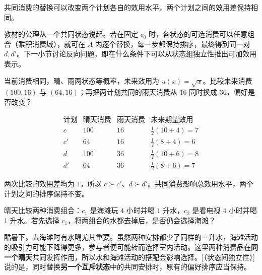 共同消费的替换可以改变两个计划各自的效用水平，两个计划之间的效用差保持相同。

教材的公理从一个共同状态说起。若在固定 $c_0$ 时，各状态的可选消费可以任意组合（乘积消费域），就可在 $A$ 内逐个替换，每一步都保持排序，最终得到同一对 $d,d'$。下一小节讨论反向问题，即在什么条件下可以从状态组独立性推出可加效用表示。

\begin{tcolorbox}[example,title=课堂例题：共同消费的替换]
\begin{question}
当前消费相同，晴、雨两状态等概率，未来效用为 $u(x)=\sqrt{x}$。比较未来消费 $(100,16)$ 与 $(64,16)$；再把两计划共同的雨天消费从 $16$ 同时换成 $36$，偏好是否改变？
\end{question}
\begin{solution}[blank-type=manual,blank-vsep=4\baselineskip]
\[
\begin{array}{c|cc|c}
 \text{计划}&\text{晴天消费}&\text{雨天消费}&\text{未来期望效用}\\\hline
 c&100&16&\tfrac12(10+4)=7\\
 c'&64&16&\tfrac12(8+4)=6\\
 d&100&36&\tfrac12(10+6)=8\\
 d'&64&36&\tfrac12(8+6)=7
\end{array}
\]

两次比较的效用差均为 $1$，所以 $c\succ c'$、$d\succ d'$。共同消费影响总效用水平，两个计划之间的排序保持不变。
\end{solution}
\end{tcolorbox}

\begin{tcolorbox}[example]
\begin{question}
晴天比较两种消费组合：$c_1$ 是海滩玩 $4$ 小时并喝 $1$ 升水，$c_2$ 是看电视 $4$ 小时并喝 $1$ 升水。若先选择 $c_1$，将两组合的水都去掉后，是否仍会选择海滩？
\end{question}
\begin{solution}[blank-type=manual,blank-vsep=3\baselineskip]
酷暑下，去海滩时有水喝尤其重要。虽然两种安排都少了同样的一升水，海滩活动的吸引力可能下降得更多，参与者便可能转而选择室内活动。这里两种消费品在\textbf{同一个晴天}共同发挥作用，所以水和海滩活动的搭配会影响选择。[（状态间独立性）] 说的是，同时替换\textbf{另一个互斥状态}中的共同安排时，原有的偏好排序应当保持。
\end{solution}
\end{tcolorbox}

